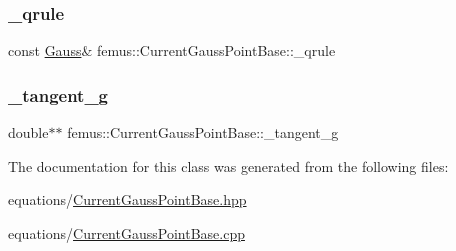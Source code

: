 \subsubsection{\texorpdfstring{\+\_\+qrule}{\_qrule}}
{\footnotesize\ttfamily const \mbox{\hyperlink{classfemus_1_1_gauss}{Gauss}}\& femus\+::\+Current\+Gauss\+Point\+Base\+::\+\_\+qrule\hspace{0.3cm}{\ttfamily [protected]}}

\mbox{\label{classfemus_1_1_current_gauss_point_base_a0272bf13da6d3f348229bf6ae498034f}} 
\subsubsection{\texorpdfstring{\+\_\+tangent\+\_\+g}{\_tangent\_g}}
{\footnotesize\ttfamily double$\ast$$\ast$ femus\+::\+Current\+Gauss\+Point\+Base\+::\+\_\+tangent\+\_\+g\hspace{0.3cm}{\ttfamily [protected]}}



The documentation for this class was generated from the following files\+:\begin{DoxyCompactItemize}
\item 
equations/\mbox{\hyperlink{_current_gauss_point_base_8hpp}{Current\+Gauss\+Point\+Base.\+hpp}}\item 
equations/\mbox{\hyperlink{_current_gauss_point_base_8cpp}{Current\+Gauss\+Point\+Base.\+cpp}}\end{DoxyCompactItemize}
